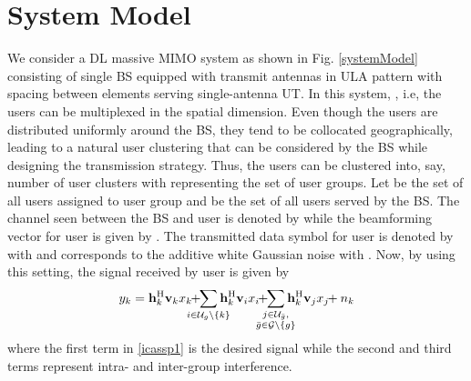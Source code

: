 \documentclass[letterpaper,conference,10pt]{IEEEtran}
\begin{document}
		
	\section{System Model}
		We consider a \ac{DL} massive \ac{MIMO} system as shown in Fig. \ref{systemModel} consisting of single \ac{BS} equipped with  transmit antennas in \ac{ULA} pattern with  spacing between elements serving  single-antenna \ac{UT}. In this system, , i.e, the users can be multiplexed in the spatial dimension. Even though the users are distributed uniformly around the \ac{BS}, they tend to be collocated geographically, leading to a natural user clustering that can be considered by the \ac{BS} while designing the transmission strategy. Thus, the users can be clustered into, say,  number of user clusters with  representing the set of user groups. Let  be the set of all users assigned to user group  and  be the set of all users served by the \ac{BS}. The channel seen between the \ac{BS} and user  is denoted by  while the beamforming vector for user  is given by . The transmitted data symbol for user  is denoted by  with  and  corresponds to the additive white Gaussian noise with . Now, by using this setting, the signal  received by user  is given by
		\begin{multline}\label{icassp1}
		y_k = \mathbf{h}_{k}^{\herm} \mathbf{v}_{k} x_{k} \!\!+\!\! \sum_{\mathclap{i \in \mc{U}_{g} \backslash \{k\}}} \mathbf{h}_{k}^{\herm} \mathbf{v}_{i} x_{i} \!\! +\!\! \sum_{\mathclap{\substack{j \in \mathcal{U}_{\bar{g}}, \\ \bar{g} \in \mathcal{G} \backslash \{g\}}}} \mathbf{h}_{k}^{\herm} \mathbf{v}_{j} x_{j}\!\! + {n}_{k}
		\end{multline}
		where the first term in \eqref{icassp1} is the desired signal while the second and third terms represent intra- and inter-group interference.
		
\end{document}
